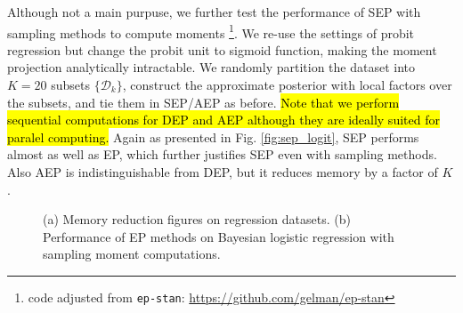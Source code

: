 \documentclass{article} %
\begin{document}
Although not a main purpuse, we further test the performance of SEP with sampling methods to compute moments \footnote{code adjusted from \texttt{ep-stan}: \url{https://github.com/gelman/ep-stan}}. We re-use the settings of probit regression but change the probit unit to sigmoid function, making the moment projection analytically intractable. We randomly partition the dataset into $K = 20$ subsets $\{\mathcal{D}_k\}$, construct the approximate posterior with local factors over the subsets, and tie them in SEP/AEP as before. \hl{Note that we perform sequential computations for DEP and AEP although they are ideally suited for paralel computing.} Again as presented in Fig. \ref{fig:sep_logit}, SEP performs almost as well as EP, which further justifies SEP even with sampling methods. Also AEP is indistinguishable from DEP, but it reduces memory by a factor of $K$.

\begin{figure}
\centering
%
\begin{minipage}[!t]{0.5\linewidth}
\end{minipage}
%
\hspace{0.3in}
%
\begin{minipage}[!t]{0.35\linewidth}
\def\svgwidth{0.7\linewidth}
\subfigure[\label{fig:sep_logit}]{

}
\end{minipage}
%
\caption{(a) Memory reduction figures on regression datasets. (b) Performance of EP methods on Bayesian logistic regression with sampling moment computations.}
\end{figure}
\end{document}
